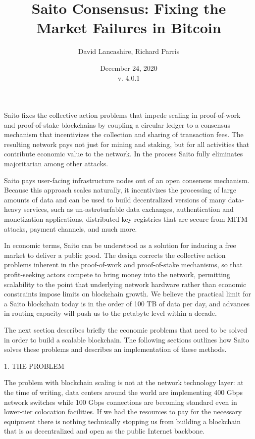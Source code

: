 \documentclass[11pt, oneside]{article}   	%
\title{Saito Consensus: Fixing the Market Failures in Bitcoin }
\author{David Lancashire, Richard Parris }
\date{December 24, 2020\\v. 4.0.1}
\begin{document}
\maketitle


\begin{onecolabstract}
Saito fixes the collective action problems that impede scaling in proof-of-work and proof-of-stake blockchains by coupling a circular ledger to a consensus mechanism that incentivizes the collection and sharing of transaction fees. The resulting network pays not just for mining and staking, but for all activities that contribute economic value to the network. In the process Saito fully eliminates majoritarian among other attacks.
\end{onecolabstract}

\begin{multicols}{2}
Saito pays user-facing infrastructure nodes out of an open consensus mechanism. Because this approach scales naturally, it incentivizes the processing of large amounts of data and can be used to build decentralized versions of many data-heavy services, such as un-astroturfable data exchanges, authentication and monetization applications, distributed key registries that are secure from MITM attacks, payment channels, and much more.

In economic terms, Saito can be understood as a solution for inducing a free market to deliver a public good. The design corrects the collective action problems inherent in the proof-of-work and proof-of-stake mechanisms, so that profit-seeking actors compete to bring money into the network, permitting scalability to the point that underlying network hardware rather than economic constraints impose limits on blockchain growth. We believe the practical limit for a Saito blockchain today is in the order of 100 TB of data per day, and advances in routing capacity will push us to the petabyte level within a decade.

The next section describes briefly the economic problems that need to be solved in order to build a scalable blockchain. The following sections outlines how Saito solves these problems and describes an implementation of these methods.


1. THE PROBLEM

The problem with blockchain scaling is not at the network technology layer: at the time of writing, data centers around the world are implementing 400 Gbps network switches while 100 Gbps connections are becoming standard even in lower-tier colocation facilities. If we had the resources to pay for the necessary equipment there is nothing technically stopping us from building a blockchain that is as decentralized and open as the public Internet backbone.


\end{multicols}
\end{document}
